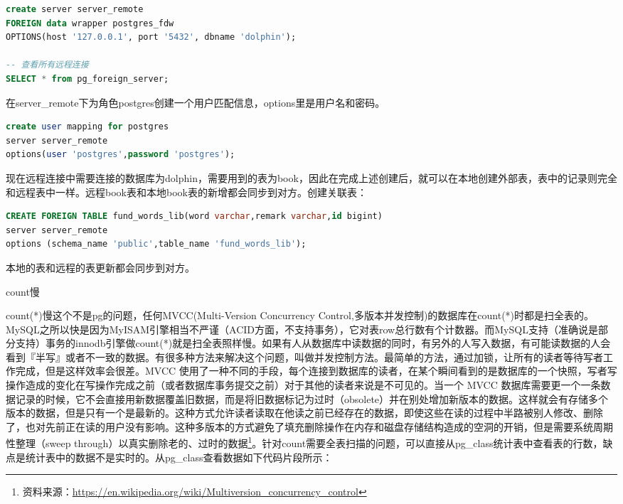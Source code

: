 \documentclass[8pt]{book}
\makeatletter
\numberwithin{dummy}{section}
\theoremstyle{ocrenumbox}
\theoremstyle{blacknumex}
\theoremstyle{blacknumbox}
\theoremstyle{ocrenum}
\renewcommand{\subsection}{\@startsection {subsection}{2}{\z@}
	{-3ex \@plus -0.1ex \@minus -.4ex}
	{0.5ex \@plus.2ex }
	{\normalfont\sffamily\bfseries}}
\makeatother
\begin{document}
\begin{lstlisting}[language=SQL]
create server server_remote 
FOREIGN data wrapper postgres_fdw 
OPTIONS(host '127.0.0.1', port '5432', dbname 'dolphin');

-- 查看所有远程连接
SELECT * from pg_foreign_server;
\end{lstlisting}

在server\_remote下为角色postgres创建一个用户匹配信息，options里是用户名和密码。

\begin{lstlisting}[language=SQL]
create user mapping for postgres 
server server_remote 
options(user 'postgres',password 'postgres');
\end{lstlisting}

现在远程连接中需要连接的数据库为dolphin，需要用到的表为book，因此在完成上述创建后，就可以在本地创建外部表，表中的记录则完全和远程表中一样。远程book表和本地book表的新增都会同步到对方。创建关联表：

\begin{lstlisting}[language=SQL]
CREATE FOREIGN TABLE fund_words_lib(word varchar,remark varchar,id bigint) 
server server_remote
options (schema_name 'public',table_name 'fund_words_lib');
\end{lstlisting}

本地的表和远程的表更新都会同步到对方。

\subsection{count慢}

count(*)慢这个不是pg的问题，任何MVCC(Multi-Version Concurrency Control,多版本并发控制)的数据库在count(*)时都是扫全表的。 MySQL之所以快是因为MyISAM引擎相当不严谨（ACID方面，不支持事务），它对表row总行数有个计数器。而MySQL支持（准确说是部分支持）事务的innodb引擎做count(*)就是扫全表照样慢。如果有人从数据库中读数据的同时，有另外的人写入数据，有可能读数据的人会看到『半写』或者不一致的数据。有很多种方法来解决这个问题，叫做并发控制方法。最简单的方法，通过加锁，让所有的读者等待写者工作完成，但是这样效率会很差。MVCC 使用了一种不同的手段，每个连接到数据库的读者，在某个瞬间看到的是数据库的一个快照，写者写操作造成的变化在写操作完成之前（或者数据库事务提交之前）对于其他的读者来说是不可见的。当一个 MVCC 数据库需要更一个一条数据记录的时候，它不会直接用新数据覆盖旧数据，而是将旧数据标记为过时（obsolete）并在别处增加新版本的数据。这样就会有存储多个版本的数据，但是只有一个是最新的。这种方式允许读者读取在他读之前已经存在的数据，即使这些在读的过程中半路被别人修改、删除了，也对先前正在读的用户没有影响。这种多版本的方式避免了填充删除操作在内存和磁盘存储结构造成的空洞的开销，但是需要系统周期性整理（sweep through）以真实删除老的、过时的数据\footnote{资料来源：\url{https://en.wikipedia.org/wiki/Multiversion_concurrency_control}}。针对count需要全表扫描的问题，可以直接从pg\_class统计表中查看表的行数，缺点是统计表中的数据不是实时的。从pg\_class查看数据如下代码片段所示：
\end{document}
